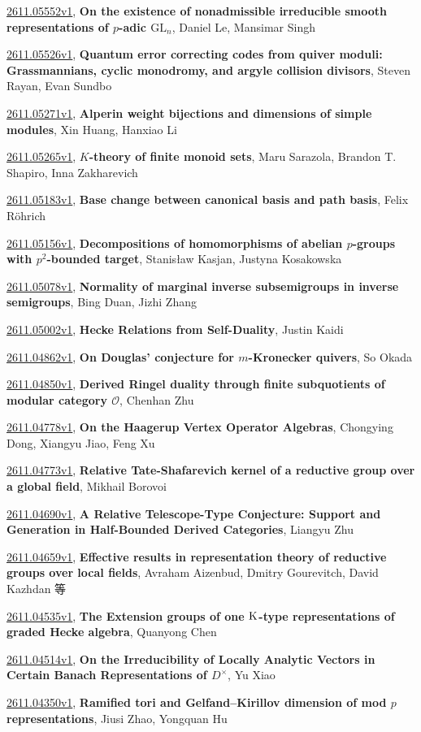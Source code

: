 \documentclass[9pt, a4paper]{article}
\theoremstyle{plain}
\theoremstyle{definition}
\theoremstyle{remark}
\newcommand{\arxiv}[3]{\href{https://arxiv.org/abs/#1}{#1}, \textbf{\textcolor{arxivblue}{#2}}, #3}
\begin{document}
\arxiv{2611.05552v1}{On the existence of nonadmissible irreducible smooth representations of $p$-adic $\mathrm{GL}_n$}{Daniel Le, Mansimar Singh}

\arxiv{2611.05526v1}{Quantum error correcting codes from quiver moduli: Grassmannians, cyclic monodromy, and argyle collision divisors}{Steven Rayan, Evan Sundbo}

\arxiv{2611.05271v1}{Alperin weight bijections and dimensions of simple modules}{Xin Huang, Hanxiao Li}

\arxiv{2611.05265v1}{$K$-theory of finite monoid sets}{Maru Sarazola, Brandon T. Shapiro, Inna Zakharevich}

\arxiv{2611.05183v1}{Base change between canonical basis and path basis}{Felix Röhrich}

\arxiv{2611.05156v1}{Decompositions of homomorphisms of abelian $p$-groups with $p^2$-bounded target}{Stanisław Kasjan, Justyna Kosakowska}

\arxiv{2611.05078v1}{Normality of marginal inverse subsemigroups in inverse semigroups}{Bing Duan, Jizhi Zhang}

\arxiv{2611.05002v1}{Hecke Relations from Self-Duality}{Justin Kaidi}

\arxiv{2611.04862v1}{On Douglas' conjecture for $m$-Kronecker quivers}{So Okada}

\arxiv{2611.04850v1}{Derived Ringel duality through finite subquotients of modular category $\mathcal O$}{Chenhan Zhu}

\arxiv{2611.04778v1}{On the Haagerup Vertex Operator Algebras}{Chongying Dong, Xiangyu Jiao, Feng Xu}

\arxiv{2611.04773v1}{Relative Tate-Shafarevich kernel of a reductive group over a global field}{Mikhail Borovoi}

\arxiv{2611.04690v1}{A Relative Telescope-Type Conjecture: Support and Generation in Half-Bounded Derived Categories}{Liangyu Zhu}

\arxiv{2611.04659v1}{Effective results in representation theory of reductive groups over local fields}{Avraham Aizenbud, Dmitry Gourevitch, David Kazhdan 等}

\arxiv{2611.04535v1}{The Extension groups of one $\rm K$-type representations of graded Hecke algebra}{Quanyong Chen}

\arxiv{2611.04514v1}{On the Irreducibility of Locally Analytic Vectors in Certain Banach Representations of $D^\times$}{Yu Xiao}

\arxiv{2611.04350v1}{Ramified tori and Gelfand--Kirillov dimension of mod $p$ representations}{Jiusi Zhao, Yongquan Hu}
\end{document}
